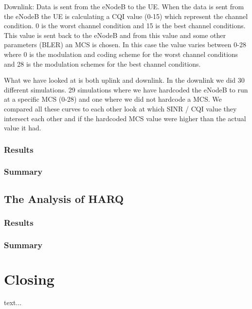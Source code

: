 \documentclass[cropmarks, frame, english]{idamasterthesis}
\begin{document}
Downlink: \newline
Data is sent from the eNodeB to the UE. When the data is sent from the eNodeB the UE is calculating a CQI value (0-15) which represent the channel condition. 0 is the worst channel condition and 15 is the best channel conditions. This value is sent back to the eNodeB and from this value and some other parameters (BLER) an MCS is chosen. In this case the value varies between 0-28 where 0 is the modulation and coding scheme for the worst channel conditions and 28 is the modulation schemes for the best channel conditions.

What we have looked at is both uplink and downlink. In the downlink we did 30 different simulations. 29 simulations where we have hardcoded the eNodeB to run at a specific MCS (0-28) and one where we did not hardcode a MCS. We compared all these curves to each other look at which SINR / CQI value they intersect each other and if the hardcoded MCS value were higher than the actual value it had.

\subsection{Results}

\subsection{Summary}


\section{The Analysis of HARQ}

\subsection{Results}

\subsection{Summary}





\chapter{Closing}

text...
\end{document}
